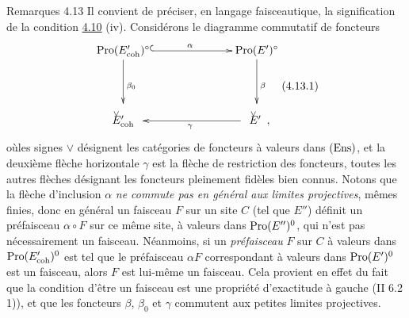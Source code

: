 \documentclass[10pt]{../fichiers-configuration-latex/smfart}
\begin{document}
\begin{enonce*}[remark]{Remarques 4.13}
Il convient de préciser, en langage faisceautique, la signification de
la condition \hyperref[VI.prop4.10]{4.10} (iv). Considérons le diagramme commutatif de
foncteurs
\[\vcenter{
\xymatrix@C=2.5cm@R=1.5cm{
\Pro(E'_{\coh})^{\circ}  \ar@{^{(}->}[r]^{\alpha}  \ar[d]^{\beta_0}&
\Pro(E')^{\circ} \ar[d]^{\beta}\\
\text{$\Ev{\coh}$} & \text{$\Ev{}$}\ar[l]^{\gamma} ,
}}\leqno{(4.13.1)}
\]
où\pageoriginale les signes $\vee$ désignent les catégories de
foncteurs à valeurs dans $(\operatorname{Ens})$, et la deuxième flèche horizontale
$\gamma$ est la flèche de restriction des foncteurs, toutes les
autres flèches désignant les foncteurs pleinement fidèles bien
connus. Notons que la flèche d'inclusion $\alpha$ \emph{ne commute
pas en général aux limites
  projectives}, mêmes finies, donc en général un faisceau $F$ sur un
site $C$ (tel que $E''$) définit un préfaisceau $\alpha \circ F$
sur ce même site, à valeurs dans $\operatorname{Pro}(E'')^{0}$, qui n'est pas
nécessairement un faisceau. Néanmoins, si un \emph{préfaisceau} $F$
sur $C$ à valeurs dans $\operatorname{Pro}(E'_{\mathrm{coh}})^{0}$ est tel que le
préfaisceau $\alpha F$ correspondant à valeurs dans $\operatorname{Pro}(E')^{0}$ est
un faisceau, alors $F$ est lui-même un faisceau. Cela provient en
effet du fait que la condition d'être un faisceau est une propriété
d'exactitude à gauche (II 6.2  1)), et que les foncteurs $\beta$,
$\beta_0$ et $\gamma$ commutent aux petites limites projectives.
\end{enonce*}
\end{document}
